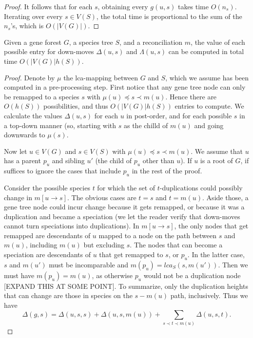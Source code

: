\documentclass[10pt]{article}
\begin{document}
\begin{toappendix}
\begin{proof}
It follows that for each $s$, obtaining every $g(u, s)$ takes time $O(n_s)$.  
Iterating over every $s \in V(S)$, the total time is proportional to the sum of the $n_s$'s, which is $O(|V(G)|)$.
\end{proof}
\end{toappendix}




\begin{theoremrep}
Given a gene forest $G$, a species tree $S$, and a reconciliation $m$, the value of each possible entry for down-moves $\Delta(u, s)$ and $\Lambda(u, s)$ can be computed in total time $O(|V(G)|h(S))$.
\end{theoremrep}

\begin{proof}
Denote by $\mu$ the lca-mapping between $G$ and $S$, which we assume has been computed in a pre-processing step.
First notice that any gene tree node can only be remapped to a species $s$ with $\mu(u) \preceq s \prec m(u)$.  Hence there are $O(h(S))$ possibilities, and thus $O(|V(G)|h(S))$ entries to compute.
We calculate the values $\Delta(u, s)$ for each $u$ in post-order, and for each possible $s$ in a top-down manner (so, starting with $s$ as the chilld of $m(u)$ and going downwards to $\mu(s)$.

Now let $u \in V(G)$ and $s \in V(S)$ with $\mu(u) \preceq s \prec m(u)$.  We assume that $u$ has a parent $p_u$ and sibling $u'$ (the child of $p_u$ other than $u$).  If $u$ is a root of $G$, if suffices to ignore the cases that include $p_u$ in the rest of the proof.

Consider the possible species $t$ for which the set of $t$-duplications could possibly change in $m[u \rightarrow s]$.  
The obvious cases are $t = s$ and $t = m(u)$.  Aside those, a gene tree node could incur change because it gets remapped, or because it was a duplication and became a speciation (we let the reader verify that down-moves cannot turn speciations into duplications).   In $m[u \rightarrow s]$, the only nodes that get remapped are descendants of $u$ mapped to a node on the path between $s$ and $m(u)$, including $m(u)$ but excluding $s$.  The nodes that can become a speciation are descendants of $u$ that get remapped to $s$, or $p_u$.  In the latter case, $s$ and $m(u')$ must be incomparable and $m(p_u) = lca_S(s, m(u'))$.  Then we must have $m(p_u) = m(u)$, as otherwise $p_u$ would not be a duplication node [EXPAND THIS AT SOME POINT].
To summarize, only the duplication heights that can change are those in species on the $s - m(u)$ path, inclusively.  Thus we have 
\[
\Delta(g, s) = \Delta(u, s, s) + \Delta(u, s, m(u)) + \sum_{s \prec t \prec m(u)} \Delta(u, s, t).
\]


\end{proof}
\end{document}
